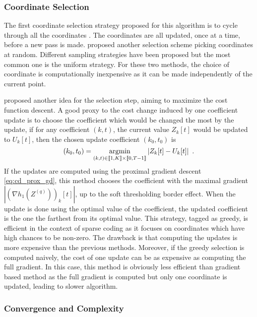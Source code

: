 \documentclass[../thesis.tex]{subfiles}
\begin{document}

\subsubsection{Coordinate Selection}
\label{ssub:coordinate_selection}

	The first coordinate selection strategy proposed for this algorithm is to
	cycle through all the coordinates \citep{Friedman2007}. The coordinates are
	all updated, once at a time, before a new pass is made. \citet{Shalev2009}
	proposed another selection scheme picking coordinates at random. Different
	sampling strategies have been proposed but the most common one is the uniform
	strategy. For these two methods, the choice of coordinate is computationally
	inexpensive as it can be made independently of the current point.
	
	\citet{Osher2009} proposed another idea for the selection step, aiming to
	maximize the cost function descent. A good proxy to the cost change induced
	by one coefficient update is to choose the coefficient which would be changed
	the most by the update, \ie{} if for any coefficient $(k, t)$, the current value
	$Z_k[t]$ would be updated to $U_k[t]$, then the chosen update coefficient
	$(k_0, t_0)$ is
	\[
		(k_0, t_0) = \operatorname*{\arg\!\min}_{(k, t)\in \llbracket 1, K\rrbracket \times \llbracket 0, T-1\rrbracket}
			\left| Z_k[t] - U_k[t] \right|~.
	\]
	If the updates are computed using the proximal gradient descent
	\autoref{eq:cd_prox_gd}, this method chooses the coefficient with the maximal
	gradient $\left|\left(\nabla h_1(Z^{(q)})\right)_k[t]\right|$, up to the soft thresholding border
	effect. When the update is done using the optimal value of the coefficient,
	the updated coefficient is the one the farthest from its optimal value.	
	This strategy, tagged as greedy, is efficient in the context of sparse coding
	as it focuses on coordinates which have high chances to be non-zero. The drawback
	is that computing the updates is more expensive than the previous methods. Moreover,
	if the greedy selection is computed naively, the cost of one update can be as
	expensive as computing the full gradient. In this case, this method is obviously
	less efficient than gradient based method as the full gradient is computed but
	only one coordinate is updated, leading to slower algorithm.



\subsubsection{Convergence and Complexity}
\label{ssub:cvg_cd}
\end{document}
